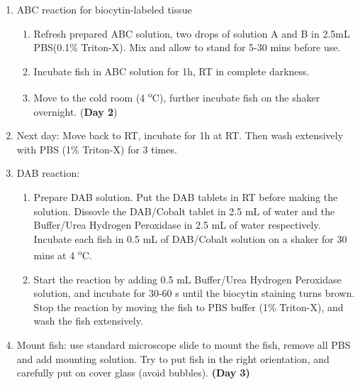 \documentclass[11pt]{article}
\begin{document}
\begin{enumerate}[label=(\alph*)]
		\item ABC reaction for biocytin-labeled tissue
		\begin{enumerate}[label=\arabic*.]
			\item Refresh prepared ABC solution, two drops of solution A and B in 2.5mL PBS(0.1\% Triton-X). Mix and allow to stand for 5-30 mins before use.
			\item Incubate fish in ABC solution for 1h, RT in complete darkness.
			\item Move to the cold room  (4 \textsuperscript{o}C), further incubate fish on the shaker overnight. (\textbf{Day 2})
		\end{enumerate}
	\item Next day: Move back to RT, incubate for 1h at RT. Then wash extensively with PBS (1\% Triton-X) for 3 times.
	\item DAB reaction:
	\begin{enumerate}[label=\arabic*.]
		\item Prepare DAB solution. Put the DAB tablets in RT before making the solution. Dissovle the DAB/Cobalt tablet in 2.5 mL of water and the Buffer/Urea Hydrogen Peroxidase in 2.5 mL of water respectively. Incubate each fish in 0.5 mL of DAB/Cobalt solution on a shaker for 30 mins at 4 \textsuperscript{o}C.
		\item Start the reaction by adding 0.5 mL Buffer/Urea Hydrogen Peroxidase solution, and incubate for 30-60 s until the biocytin staining turns brown. Stop the reaction by moving the fish to PBS buffer (1\% Triton-X), and wash the fish extensively.
	\end{enumerate}
	\item Mount fish: use standard microscope slide to mount the fish, remove all PBS and add mounting solution. Try to put fish in the right orientation, and carefully put on cover glass (avoid bubbles). \textbf{(Day 3)}
	
	\end{enumerate}
\end{document}
